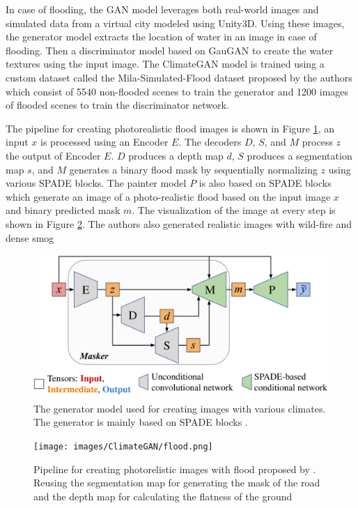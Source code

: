     In case of flooding, the GAN model leverages both real-world images and simulated data from a virtual city modeled using Unity3D. Using these images, the generator model extracts the location of water in an image in case of flooding. Then a discriminator model based on GauGAN to create the water textures using the input image. The ClimateGAN model is trained using a custom dataset called the Mila-Simulated-Flood dataset proposed by the authors which consist of 5540 non-flooded scenes to train the generator and 1200 images of flooded scenes to train the discriminator network. 
    
    The pipeline for creating photorealistic flood images is shown in Figure \ref{fig:flood_pipeline}, an input $x$ is processed using an Encoder $E$. The decoders $D$, $S$, and $M$ process $z$ the output of Encoder $E$. $D$ produces a depth map $d$, $S$ produces a segmentation map $s$, and $M$ generates a binary flood mask by sequentially normalizing $z$ using various SPADE \cite{park2019SPADE} blocks. The painter model $P$ is also based on SPADE blocks which generate an image of a photo-realistic flood based on the input image $x$ and binary predicted mask $m$. The visualization of the image at every step is shown in Figure \ref{fig:flood_representation}. The authors also generated realistic images with wild-fire and dense smog
    
    \begin{figure}[H]
        \centering
        \includegraphics[scale=0.1]{images/ClimateGAN/image-001.png}
        \caption[ClimateGAN model]{The generator model used for creating images with various climates. The generator is mainly based on SPADE blocks \cite{park2019SPADE}.}
        \label{fig:flood_pipeline}
    \end{figure}
    
    \begin{figure}
        \centering
        \texttt{[image: images/ClimateGAN/flood.png]}
        \caption[ClimateGAN pipeline]{Pipeline for creating photorelistic images with flood proposed by \citet[p.6]{climategan}. Reusing the segmentation map for generating the mask of the road and the depth map for calculating the flatness of the ground}
        \label{fig:flood_representation}
    \end{figure}
    
